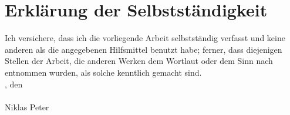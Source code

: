 


\chapter*{Erklärung der Selbstständigkeit}
%
Ich versichere, dass ich die vorliegende Arbeit selbstständig verfasst und keine anderen als die angegebenen Hilfsmittel benutzt habe; ferner, dass diejenigen Stellen der Arbeit, die anderen Werken dem Wortlaut oder dem Sinn nach entnommen wurden, als solche kenntlich gemacht sind.
%
\mbox{}\vspace{4\baselineskip}\\
%
\npHandoverLocation, den \npHandoverDate \\
\mbox{}\vspace{2\baselineskip}\\
\vspace{3cm}%
Niklas Peter \\


